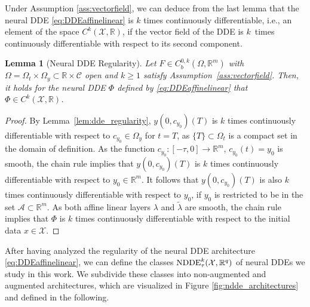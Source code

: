 \documentclass[10pt]{article}
\numberwithin{equation}{section}
\newtheorem{lemma}[theorem]{Lemma}
\begin{document}
	Under Assumption \ref{ass:vectorfield}, we can deduce from the last lemma that the neural DDE \eqref{eq:DDEaffinelinear} is $k$ times continuously differentiable, i.e., an element of the space $C^k(\mathcal{X},\mathbb{R})$, if the vector field of the DDE is $k$~times continuously differentiable with respect to its second component. 
	
	\begin{lemma}[Neural DDE Regularity]\label{lem:ndde_regularity}
		Let $F\in C^{0,k}_b(\Omega,\mathbb{R}^m)$ with $\Omega = \Omega_t \times \Omega_y \subset \mathbb{R}\times \mathcal{C}$ open and $k \geq 1$ satisfy Assumption~\ref{ass:vectorfield}. Then, it holds for the neural DDE $\Phi$ defined by \eqref{eq:DDEaffinelinear} that $\Phi\in C^k(\mathcal{X},\mathbb{R})$.
	\end{lemma}
	
	\begin{proof}
		By Lemma~\ref{lem:dde_regularity}, $y(0,c_{y_0})(T)$ is $k$ times continuously differentiable with respect to $c_{y_0}\in \Omega_y$ for $t =T$, as $\{T\}\subset \Omega_t$ is a compact set in the domain of definition. As the function $c_{y_0}:[-\tau,0]\rightarrow \mathbb{R}^m$, $c_{y_0}(t) = y_0$ is smooth, the chain rule implies that $y(0,c_{y_0})(T)$ is $k$ times continuously differentiable with respect to $y_0\in \mathbb{R}^m$. It follows that $y(0,c_{y_0})(T)$ is also $k$ times continuously differentiable with respect to $y_0$, if $y_0$ is restricted to be in the set $\mathcal{A}\subset \mathbb{R}^m$. As both affine linear layers $\lambda$ and $\tilde \lambda$ are smooth, the chain rule implies that $\Phi$ is $k$ times continuously differentiable with respect to the initial data $x \in \mathcal{X}$.
	\end{proof}
	
	
	
	
	
	
	
	After having analyzed the regularity of the neural DDE architecture \eqref{eq:DDEaffinelinear}, we can define the classes $\textup{NDDE}_\tau^k(\mathcal{X},\mathbb{R}^q)$ of neural DDEs we study in this work. We subdivide these classes into non-augmented and augmented architectures, which are visualized in Figure \ref{fig:ndde_architectures} and defined in the following.
	
\end{document}
